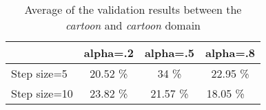 \documentclass[11pt,twoside,a4paper]{article}
\begin{document}
\begin{table}[!h]
  \begin{adjustwidth}{-.5in}{-.5in}
  \begin{center}
    \begin{tabular}{l | c | c | c}
        & alpha=.2 & alpha=.5 & alpha=.8 \\
      \hline
	Step size=5 & 20.52 \% & 34 \% & 22.95 \% \\
	Step size=10 & 23.82 \% & 21.57 \% & 18.05 \% \
    \end{tabular}
    \caption{Average of the validation results between the \textit{cartoon} and \textit{cartoon} domain}
    \label{da:avg}
  \end{center}
  \end{adjustwidth}
\end{table}
\end{document}
